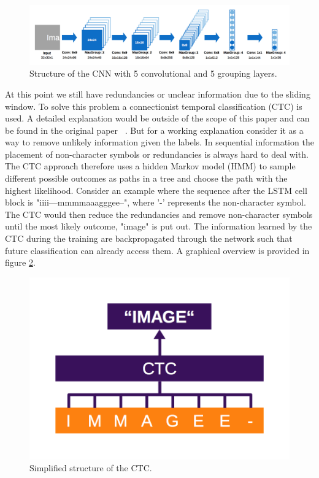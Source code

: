 \documentclass{utue} %
\begin{document}
\begin{figure}[h!]
	\centering
	\includegraphics[width=\textwidth]{graphics/model_cnn.png}
	\caption{\label{fig:cnn_structure} Structure of the CNN with 5 convolutional and 5 grouping layers.}
\end{figure}

At this point we still have redundancies or unclear information due to the sliding window. To solve this problem a connectionist temporal classification (CTC) is used. A detailed explanation would be outside of the scope of this paper and can be found in the original paper  ~\cite{Graves:2006:CTC:1143844.1143891}.
But for a working explanation consider it as a way to remove unlikely information given the labels. In sequential information the placement of non-character symbols or redundancies is always hard to deal with. The CTC approach therefore uses a hidden Markov model (HMM) to sample different possible outcomes as paths in a tree and choose the path with the highest likelihood. Consider an example where the sequence after the LSTM cell block is "iiii---mmmmaaagggee--", where '-' represents the non-character symbol. The CTC would then reduce the redundancies and remove non-character symbols until the most likely outcome, "image" is put out. The information learned by the CTC during the training are backpropagated through the network such that future classification can already access them. A graphical overview is provided in figure \ref{fig:structure_ctc}. \\
\begin{figure}[h!]
	\centering
	\includegraphics[width=\columnwidth]{graphics/model_ctc.png}
	\caption{\label{fig:structure_ctc} Simplified structure of the CTC.}
\end{figure}
\end{document}
